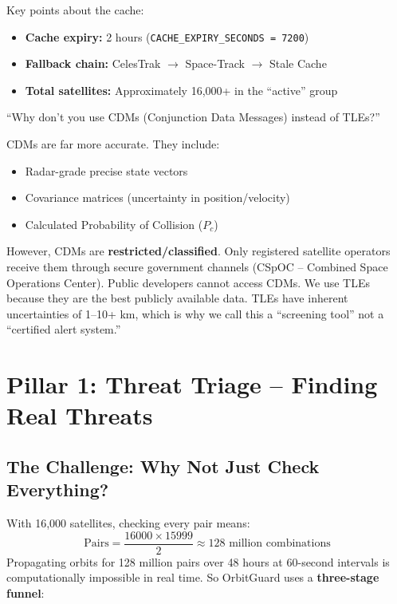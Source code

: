 \documentclass[12pt,a4paper]{article}
\begin{document}
Key points about the cache:
\begin{itemize}
    \item \textbf{Cache expiry:} 2 hours (\texttt{CACHE\_EXPIRY\_SECONDS = 7200})
    \item \textbf{Fallback chain:} CelesTrak $\rightarrow$ Space-Track $\rightarrow$ Stale Cache
    \item \textbf{Total satellites:} Approximately 16,000+ in the ``active'' group
\end{itemize}

\begin{questionbox}
``Why don't you use CDMs (Conjunction Data Messages) instead of TLEs?''
\end{questionbox}
\begin{answerbox}
CDMs are far more accurate. They include:
\begin{itemize}
    \item Radar-grade precise state vectors
    \item Covariance matrices (uncertainty in position/velocity)
    \item Calculated Probability of Collision ($P_c$)
\end{itemize}
However, CDMs are \textbf{restricted/classified}. Only registered satellite operators receive them through secure government channels (CSpOC -- Combined Space Operations Center). Public developers cannot access CDMs. We use TLEs because they are the best publicly available data. TLEs have inherent uncertainties of 1--10+ km, which is why we call this a ``screening tool'' not a ``certified alert system.''
\end{answerbox}

\newpage
\section{Pillar 1: Threat Triage -- Finding Real Threats}

\subsection{The Challenge: Why Not Just Check Everything?}
With 16,000 satellites, checking every pair means:
\[
\text{Pairs} = \frac{16000 \times 15999}{2} \approx 128 \text{ million combinations}
\]
Propagating orbits for 128 million pairs over 48 hours at 60-second intervals is computationally impossible in real time. So OrbitGuard uses a \textbf{three-stage funnel}:
\end{document}
